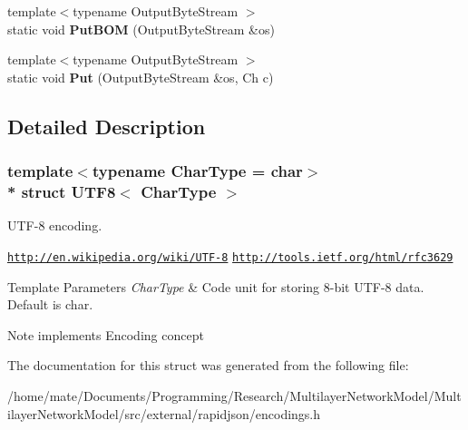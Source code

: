 \begin{DoxyCompactItemize}
\item 
{\footnotesize template$<$typename Output\+Byte\+Stream $>$ }\\static void {\bfseries Put\+B\+OM} (Output\+Byte\+Stream \&os)\hypertarget{structUTF8_a6b171e5f0662ad81d498875bbdbc536a}{}\label{structUTF8_a6b171e5f0662ad81d498875bbdbc536a}

\item 
{\footnotesize template$<$typename Output\+Byte\+Stream $>$ }\\static void {\bfseries Put} (Output\+Byte\+Stream \&os, Ch c)\hypertarget{structUTF8_ab24c23227413798e9be28a21eb26fe51}{}\label{structUTF8_ab24c23227413798e9be28a21eb26fe51}

\end{DoxyCompactItemize}


\subsection{Detailed Description}
\subsubsection*{template$<$typename Char\+Type = char$>$\\*
struct U\+T\+F8$<$ Char\+Type $>$}

U\+T\+F-\/8 encoding. 

\href{http://en.wikipedia.org/wiki/UTF-8}{\tt http\+://en.\+wikipedia.\+org/wiki/\+U\+T\+F-\/8} \href{http://tools.ietf.org/html/rfc3629}{\tt http\+://tools.\+ietf.\+org/html/rfc3629} 
\begin{DoxyTemplParams}{Template Parameters}
{\em Char\+Type} & Code unit for storing 8-\/bit U\+T\+F-\/8 data. Default is char. \\
\hline
\end{DoxyTemplParams}
\begin{DoxyNote}{Note}
implements Encoding concept 
\end{DoxyNote}


The documentation for this struct was generated from the following file\+:\begin{DoxyCompactItemize}
\item 
/home/mate/\+Documents/\+Programming/\+Research/\+Multilayer\+Network\+Model/\+Multilayer\+Network\+Model/src/external/rapidjson/encodings.\+h\end{DoxyCompactItemize}
